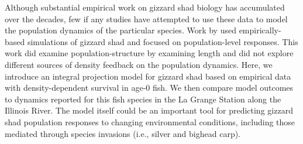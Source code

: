 \documentclass[preprint,review,12pt,authoryear]{elsarticle}
\begin{document}


Although substantial empirical work on gizzard shad biology has accumulated over the decades, few if any studies have attempted to use these data to model the population dynamics of the particular species.
Work by \citet{catalano2010size, catalano2011whole} used empirically-based simulations of gizzard shad and focused on population-level responses.
This work did examine population-structure by examining length and did
not explore different sources of density feedback on the population
dynamics.
Here, we introduce an integral projection model for gizzard shad based on empirical data with density-dependent survival in age-0 fish.
We then compare model outcomes to dynamics reported for this fish species in the La Grange Station along the Illinois River.
The model itself could be an important tool for predicting gizzard shad population responses to changing environmental conditions, including those mediated through species invasions (i.e., silver and bighead carp).
\end{document}
